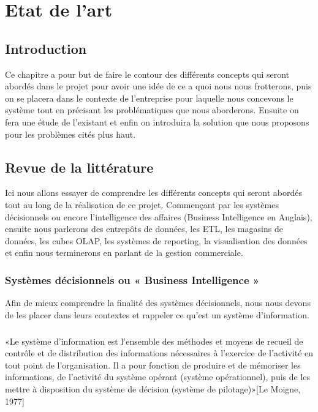 \chapter{Etat de l'art}

\section*{Introduction}%
%
Ce chapitre a pour but de faire le contour des différents concepts qui seront abordés dans le projet pour avoir une idée de ce a quoi nous nous frotterons, puis on se placera dans le contexte de l’entreprise pour laquelle nous concevons le système tout en précisant les problématiques que nous aborderons. Ensuite on fera une étude de l’existant et enfin on introduira la solution que nous proposons pour les problèmes cités plus haut.

\section{Revue de la littérature}
Ici nous allons essayer de comprendre les différents concepts qui seront abordés tout au long de la réalisation de ce projet. Commençant par les systèmes décisionnels ou encore l’intelligence des affaires (Business Intelligence en Anglais), ensuite nous parlerons des entrepôts de données, les ETL, les magasins de données, les cubes OLAP, les systèmes de reporting, la visualisation des données et enfin nous terminerons en parlant de la gestion commerciale.

\subsection{Systèmes décisionnels ou « Business Intelligence »}
Afin de mieux comprendre la finalité des systèmes décisionnels, nous nous devons de les placer dans leurs contextes et rappeler ce qu’est un système d’information.

\paragraph{}
«Le système d’information est l’ensemble des méthodes et moyens de recueil de contrôle et de distribution des informations nécessaires à l’exercice de l’activité en tout point de l’organisation. Il a pour fonction de produire et de mémoriser les informations, de l’activité du système opérant (système opérationnel), puis de les mettre à disposition du système de décision (système de pilotage)»[Le Moigne, 1977]
